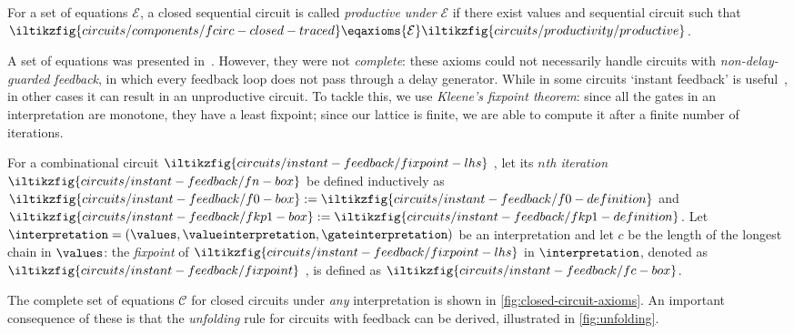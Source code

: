 \documentclass[10pt]{article}
\begin{document}
    \begin{definition}[Productivity]
        For a set of equations \(\mathcal{E}\), a closed sequential circuit  is called \emph{productive under} \(\mathcal{E}\) if there exist values  and sequential circuit  such that
        \(
            \iltikzfig{circuits/components/fcirc-closed-traced} 
            \eqaxioms{\mathcal{E}}
            \iltikzfig{circuits/productivity/productive}
        \).
    \end{definition}

    \noindent
    A set of equations was presented in~\cite{ghica2016categorical}.
    However, they were not \emph{complete}: these axioms could not necessarily handle circuits with \emph{non-delay-guarded feedback}, in which every feedback loop does not pass through a delay generator.
    While in some circuits `instant feedback' is useful~\cite{riedel2004cyclic,mendler2012constructive}, in other cases it can result in an unproductive circuit.
    To tackle this, we use \emph{Kleene's fixpoint theorem}: since all the gates in an interpretation are monotone, they have a least fixpoint; since our lattice is finite, we are able to compute it after a finite number of iterations.

    \begin{definition}
        For a combinational circuit 
        \(\iltikzfig{circuits/instant-feedback/fixpoint-lhs}\)
        , let its \emph{\(n\)th iteration} 
        \(\iltikzfig{circuits/instant-feedback/fn-box}\) 
        be defined inductively as 
        \(
            \iltikzfig{circuits/instant-feedback/f0-box} 
            := 
            \iltikzfig{circuits/instant-feedback/f0-definition}
        \) 
        and 
        \(
            \iltikzfig{circuits/instant-feedback/fkp1-box} 
            := 
            \iltikzfig{circuits/instant-feedback/fkp1-definition}
        \).
        Let \(\interpretation = (\values,\valueinterpretation,\gateinterpretation)\) be an interpretation and let \(c\) be the length of the longest chain in \(\values\): the \emph{fixpoint} of 
        \(\iltikzfig{circuits/instant-feedback/fixpoint-lhs}\)
        in \(\interpretation\), denoted as 
        \(\iltikzfig{circuits/instant-feedback/fixpoint}\)
        , is defined as \(\iltikzfig{circuits/instant-feedback/fc-box}\).
    \end{definition}

    \noindent
    The complete set of equations \(\mathcal{C}\) for closed circuits under \emph{any} interpretation is shown in \cref{fig:closed-circuit-axioms}.
    An important consequence of these is that the \emph{unfolding} rule for circuits with feedback can be derived, illustrated in \cref{fig:unfolding}.
\end{document}
